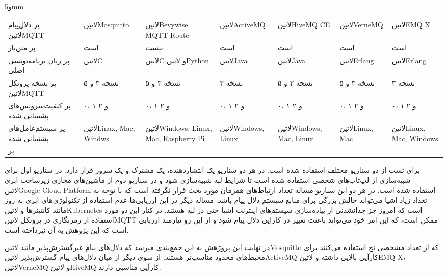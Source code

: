 ‌و{5mm}
\begin{tabularx}
  {\textwidth}
  {p{3cm}*6{X}}
‌پر
دلال‌پیام ‌لاتین{MQTT} & ‌لاتین{Mosquitto} & ‌لاتین{Bevywise MQTT Route} & ‌لاتین{ActiveMQ} & ‌لاتین{HiveMQ CE} & ‌لاتین{VerneMQ} & ‌لاتین{EMQ X} \\
‌پر
متن‌باز & است & نیست & است & است & است & است \\
‌پر
زبان برنامه‌نویسی اصلی & ‌لاتین{C} & ‌لاتین{C} و ‌لاتین{Python} & ‌لاتین{Java} & ‌لاتین{Java} & ‌لاتین{Erlang} & ‌لاتین{Erlang} \\
‌پر
نسخه پروتکل ‌لاتین{MQTT} & نسخه ۳ و ۵ & نسخه ۳ و ۵ & نسخه ۳ & نسخه ۳ و ۵ & نسخه ۳ و ۵ & نسخه ۳ \\
‌پر
کیفیت‌سرویس‌های پشتیبانی شده & ۰، ۱ و ۲ & ۰، ۱ و ۲ & ۰، ۱ و ۲ & ۰، ۱ و ۲ & ۰، ۱ و ۲ & ۰، ۱ و ۲ \\
‌پر
سیستم‌عامل‌های پشتبیانی شده & ‌لاتین{Linux, Mac, Windws} & ‌لاتین{Windows, Linux, Mac, Raspberry Pi} & ‌لاتین{Windows, Linux} & ‌لاتین{Windows, Mac, Linux} & ‌لاتین{Linux, Mac} & ‌لاتین{Linux, Mac, Windows} \\
‌پر
\end{tabularx}

برای تست از دو سناریو مختلف استفاده شده است. در هر دو سناریو یک انتشاردهنده، یک مشترک و یک سرور قرار دارد. در سناریو اول برای شبیه‌سازی از لپ‌تاب‌های شخصی استفاده شده است
تا شرایط لبه شبیه‌سازی شود و در سناریو دوم از ماشین‌های مجازی زیرساخت ابری ‌لاتین{Google Cloud Platform} استفاده شده است.
در هر دو این سناریو مساله تعداد ارتباط‌های همزمان مورد بحث قرار نگرفته است که با توجه به تعداد زیاد اشیا می‌تواند چالش بزرگی برای منابع سیستم دلال پیام باشد.
مساله دیگر در این ارزیابی‌ها عدم استفاده از تکنولوژی‌های ابری به روز مانند کانتینرها و ‌لاتین{Kubernetes} است که امروز جز جدانشدنی از پیاده‌سازی سیستم‌های اینترنت اشیا حتی در لبه هستند.
در کنار این دو مورد استفاده از رمزنگاری در پروتکل ‌لاتین{MQTT} ممکن است، که این امر خود می‌تواند باعثث تغییر در کارایی دلال پیام شود و از این رو نیازمند ارزبابی است که این پژوهش به آن نپرداخته است.

در نهایت این پروژهش به این جمع‌بندی میرسد که دلال‌های پیام غیرگسترش‌پذیر مانند ‌لاتین{Mosquitto} که از تعداد مشخصی نخ استفاده می‌کنند برای محیط‌های محدود مناسب‌تر هستند.
از سوی دیگر از میان دلال‌های پیام گسترش‌پذیر ‌لاتین{ActiveMQ} کارآیی بالایی داشته و ‌لاتین{EMQ X}، ‌لاتین{VerneMQ} و ‌لاتین{HiveMQ} کارآیی مناسبی دارند.

